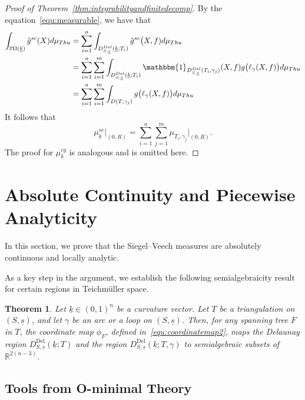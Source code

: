 \documentclass{compositio}
\numberwithin{equation}{section}
\numberwithin{figure}{section}
\theoremstyle{definition}
\theoremstyle{plain}
\newtheorem{theorem}[definition]{Theorem}
\begin{document}
{\begin{proof}[Proof of Theorem~\ref{thm:integrabilityandfinitedecomp}]
    
    By the equation~\eqref{equ:measurable}, we have that  
    \begin{align*}
        \int_{\mathbb{P}\Omega(\underline{k})}\hat{g}^{sc}(X)d\mu_{Thu}
        & = \sum_{i=1}^a\int_{D_{S,\underline{s}}^{Del}(\underline{k};T_i)}\hat{g}^{sc}\big(X,f)d\mu_{Thu}\\
        & = \sum_{i=1}^a\sum\limits_{i=1}^{m}
        \int_{D_{S,\underline{s}}^{Del}(\underline{k};T_i)}\mathbbm{1}_{D_{S,\underline{s}}^{Del}(T_i,\gamma_j)}(X, f)g\big(\ell_{\gamma}(X,f)\big)d\mu_{Thu}\\
        & = \sum_{i=1}^a\sum\limits_{i=1}^{m}
        \int_{D(T,\gamma_j)}
         g\big(\ell_{\gamma}(X,f)\big)d\mu_{Thu}
    \end{align*}
    It follows that 
    $$
    \mu^{sc}_{\underline{k}}\Big|_{(0, R)} = \sum_{i=1}^{a} \sum_{j=1}^{m} \mu_{T_i, \gamma_j}\Big|_{(0, R)}.  
    $$
    The proof for $\mu^{cg}_{\underline{k}}$ is analogous and is omitted here.
\end{proof}


\section{Absolute Continuity and Piecewise Analyticity}\label{bigsec:regularity}

In this section, we prove that the Siegel–Veech measures are absolutely continuous and locally analytic.

As a key step in the argument, we establish the following semialgebraicity result for certain regions in Teichm\"uller space.

\begin{theorem}\label{thm:semialgdelaunayregion}
Let $\underline{k} \in (0,1)^n$ be a curvature vector. Let $T$ be a triangulation on $(S,\underline{s})$, and let $\gamma$ be an arc or a loop on $(S,\underline{s})$. Then, for any spanning tree $F$ in $T$, the coordinate map $\phi_F$, defined in~\eqref{equ:coordinatemap2}, maps the Delaunay region $D_{S,\underline{s}}^{\mathrm{Del}}(\underline{k};T)$ and the region $D_{S,\underline{s}}^{\mathrm{Del}}(\underline{k};T,\gamma)$ to semialgebraic subsets of $\mathbb{R}^{2(n-3)}$.
\end{theorem}


\subsection{Tools from O-minimal Theory}\label{sec:ominimal}

}
\end{document}
